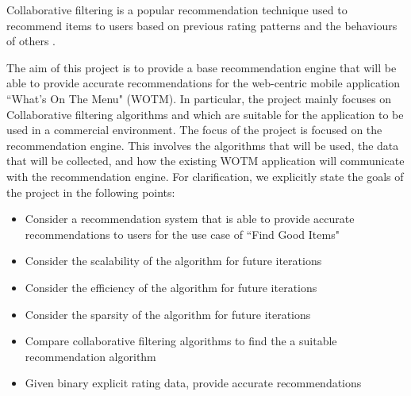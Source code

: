 Collaborative filtering is a popular recommendation technique used to recommend items to users based on previous rating patterns and the behaviours of others \cite{itembased, schafer2007collaborative, survey}. 

The aim of this project is to provide a base recommendation engine that will be able to provide accurate recommendations for the web-centric mobile application ``What's On The Menu" (WOTM). In particular, the project mainly focuses on Collaborative filtering algorithms and which are suitable for the application to be used in a commercial environment. The focus of the project is focused on the recommendation engine. This involves the algorithms that will be used, the data that will be collected, and how the existing WOTM application will communicate with the recommendation engine. 
For clarification, we explicitly state the goals of the project in the following points:
\begin{itemize}
	\item{Consider a recommendation system that is able to provide accurate recommendations to users for the use case of ``Find Good Items"}
	\item{Consider the scalability of the algorithm for future iterations}
	\item{Consider the efficiency of the algorithm for future iterations}
	\item{Consider the sparsity of the algorithm for future iterations}
    \item{Compare collaborative filtering algorithms to find the a suitable recommendation algorithm}
	\item{Given binary explicit rating data, provide accurate recommendations}
\end{itemize}




